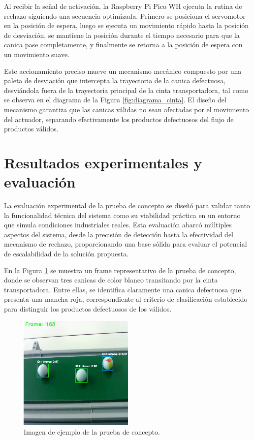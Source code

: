 \documentclass[11pt,spanish,listoffigures,listoftables]{tfgetsinf}
\begin{document}
Al recibir la señal de activación, la Raspberry Pi Pico WH ejecuta la rutina de rechazo siguiendo una secuencia optimizada. Primero se posiciona el servomotor en la posición de espera, luego se ejecuta un movimiento rápido hasta la posición de desviación, se mantiene la posición durante el tiempo necesario para que la canica pase completamente, y finalmente se retorna a la posición de espera con un movimiento suave.

Este accionamiento preciso mueve un mecanismo mecánico compuesto por una paleta de desviación que intercepta la trayectoria de la canica defectuosa, desviándola fuera de la trayectoria principal de la cinta transportadora, tal como se observa en el diagrama de la Figura \ref{fig:diagrama_cinta}. El diseño del mecanismo garantiza que las canicas válidas no sean afectadas por el movimiento del actuador, separando efectivamente los productos defectuosos del flujo de productos válidos.

\section{Resultados experimentales y evaluación} \label{sec:resultados_evaluacion}
La evaluación experimental de la prueba de concepto se diseñó para validar tanto la funcionalidad técnica del sistema como su viabilidad práctica en un entorno que simula condiciones industriales reales. Esta evaluación abarcó múltiples aspectos del sistema, desde la precisión de detección hasta la efectividad del mecanismo de rechazo, proporcionando una base sólida para evaluar el potencial de escalabilidad de la solución propuesta.

En la Figura \ref{fig:imagen_prueba_concepto} se muestra un frame representativo de la prueba de concepto, donde se observan tres canicas de color blanco transitando por la cinta transportadora. Entre ellas, se identifica claramente una canica defectuosa que presenta una mancha roja, correspondiente al criterio de clasificación establecido para distinguir los productos defectuosos de los válidos. 

\begin{figure}[H]
   \centering
   \includegraphics[width=0.5\textwidth]{images/prueba_de_concepto/frame_170.png}
   \caption[Imagen de ejemplo de la prueba de concepto]{Imagen de ejemplo de la prueba de concepto.}
   \label{fig:imagen_prueba_concepto}
\end{figure}
\end{document}
